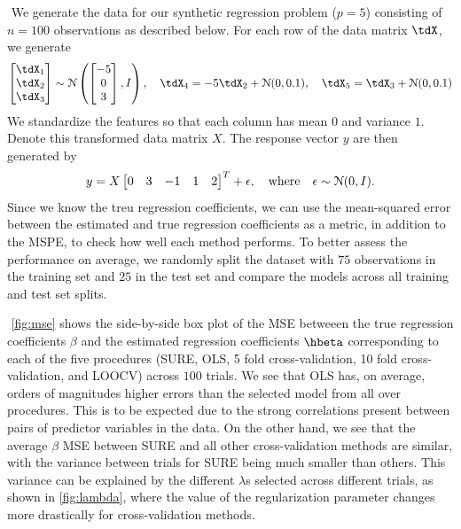 $ $\newline
We generate the data for our synthetic regression problem ($p=5$) consisting of $n=100$ observations as described below. For each row of the data matrix $\tdX$, we generate
\[
\begin{bmatrix} \tdX_1 \\ \tdX_2 \\ \tdX_3 \end{bmatrix} \sim \distNorm \left( \begin{bmatrix} -5 \\ 0 \\ 3 \end{bmatrix}, I \right), \quad \tdX_4 = -5\tdX_2 + \distNorm(0, 0.1), \quad \tdX_5 = \tdX_3 + \distNorm(0, 0.1)
\]
We standardize the features so that each column has mean $0$ and variance $1$. Denote this transformed data matrix $X$. The response vector $y$ are then generated by
\[
y = X\begin{bmatrix} 0 & 3 & -1 & 1 & 2 \end{bmatrix}^T + \epsilon, \quad \text{where} \quad \epsilon \sim \mathcal{N}(0, I).
\]
Since we know the treu regression coefficients, we can use the mean-squared error between the estimated and true regression coefficients as a metric, in addition to the MSPE, to check how well each method performs. To better assess the performance on average, we randomly split the dataset with $75$ observations in the training set and $25$ in the test set and compare the models across all training and test set splits.

$ $\newline
\cref{fig:mse} shows the side-by-side box plot of the MSE betweeen the true regression coefficients $\beta$ and the estimated regression coefficients $\hbeta$ corresponding to each of the five procedures (SURE, OLS, 5 fold cross-validation, 10 fold cross-validation, and LOOCV) across $100$ trials. We see that OLS has, on average, orders of magnitudes higher errors than the selected model from all over procedures. This is to be expected due to the strong correlations present between pairs of predictor variables in the data. On the other hand, we see that the average $\beta$ MSE between SURE and all other cross-validation methods are similar, with the variance between trials for SURE being much smaller than others. This variance can be explained by the different $\lambda$s selected across different trials, as shown in \cref{fig:lambda}, where the value of the regularization parameter changes more drastically for cross-validation methods.

